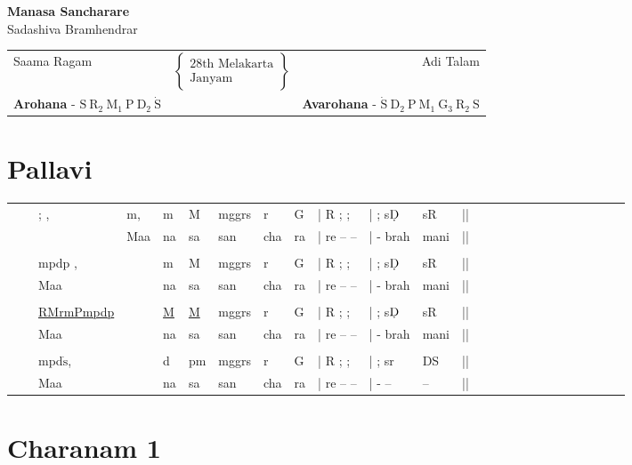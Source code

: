 \documentclass[12pt]{article}
\newcommand{\pagetitle}[2]{
\vspace*{-8pt}
\begin{center}
{\LARGE \textbf{#1}}\\#2
\end{center}
\vspace*{-8pt}
}
\newcommand*\ud[1]{\mathrm{\underaccent{\dot}{#1}}}
\newcommand*\od[1]{\mathrm{\dot{#1}}}
\begin{document}
\pagetitle{Manasa Sancharare}{Sadashiva Bramhendrar}

\begin{center}
\begin{tabular}{l c r}

Saama Ragam &

$\begin{Bmatrix}
\text{28th Melakarta}\\
\text{Janyam }  
\end{Bmatrix}$

& Adi Talam
\\
\textbf{Arohana} - $\mathrm{S\:R_2\:M_1\:P\:D_2\:\dot{S}}$  & &  \textbf{Avarohana} - $\mathrm{\dot{S}\:D_2\:P\:M_1\:G_3\:R_2\:S}$

\end{tabular}
\end{center}




\section*{Pallavi}

\begin{tabu}{l l l l l l l l l l l l l l l l l l l l l l l l l }

&&; ,&m,&m&M&mggrs&r&G&| R ; ;&| ; s$\ud{D}$&sR&||\\
\rowfont{\scriptsize}&&&Maa&na&sa&san&cha&ra&|  re -- --&| - brah&mani&||\\
\\
&&mpdp ,&&m&M&mggrs&r&G&| R ; ;&| ; s$\ud{D}$&sR&||\\
\rowfont{\scriptsize}&&Maa&&na&sa&san&cha&ra&|  re -- --&| - brah&mani&||\\
\\
&&\underline{RMrmPmpdp}&&\underline{M}&\underline{M}&mggrs&r&G&| R ; ;&| ; s$\ud{D}$&sR&||\\
\rowfont{\scriptsize}&&Maa&&na&sa&san&cha&ra&|  re -- --&| - brah&mani&||\\
\\
&&mpd$\od{s}$,&&d&pm&mggrs&r&G&| R ; ;&| ; sr&DS&||\\
\rowfont{\scriptsize}&&Maa&&na&sa&san&cha&ra&|  re -- --&| - --&--&||\\
\end{tabu}


\section*{Charanam 1}
\end{document}
